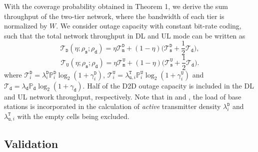 \documentclass[twocolumn,english]{IEEEtran}
\theoremstyle{plain}
\theoremstyle{definition}
\begin{document}
With the coverage probability obtained in Theorem 1, we derive the
sum throughput of the two-tier network, where the bandwidth of each
tier is normalized by $W$. We consider outage capacity with constant
bit-rate coding, such that the total network throughput in DL and
UL mode can be written as
\begin{equation}
\mathcal{T}_{\mathtt{D}}\left(\eta;\rho_{\mathtt{s}};\rho_{\mathtt{d}}\right)=\eta\mathcal{T}_{\mathtt{m}}^{\mathtt{D}}+\left(1-\eta\right)(\mathcal{T}_{\mathtt{s}}^{\mathtt{D}}+\frac{1}{2}\mathcal{T}_{\mathtt{d}}\bigr),\label{eq:thrpt_D}
\end{equation}
\begin{equation}
\mathcal{T}_{\mathtt{U}}\left(\eta;\rho_{\mathtt{s}};\rho_{\mathtt{d}}\right)=\eta\mathcal{T}_{\mathtt{m}}^{\mathtt{U}}+\left(1-\eta\right)(\mathcal{T}_{\mathtt{s}}^{\mathtt{U}}+\frac{1}{2}\mathcal{T}_{\mathtt{d}}\bigr).\label{eq:thrpt_U}
\end{equation}
where $\mathcal{T}_{i}^{\mathtt{D}}=\lambda_{i}^{\mathtt{D}}\mathbb{P}_{i}^{\mathtt{D}}\log_{2}(1+\gamma_{i}^{\mathtt{D}})$,
$\mathcal{T}_{i}^{\mathtt{U}}=\lambda_{\mathtt{u},i}^{\mathtt{T}}\mathbb{P}_{i}^{\mathtt{U}}\log_{2}(1+\gamma_{i}^{\mathtt{U}})$
and $\mathcal{T}_{\mathtt{d}}=\lambda_{\mathtt{d}}\mathbb{P}_{\mathtt{d}}\log_{2}(1+\gamma_{\mathtt{d}})$.
Half of the D2D outage capacity is included in the DL and UL network
throughput, respectively. Note that in  and
, the load of base stations is incorporated
in the calculation of \emph{active} transmitter density $\lambda_{i}^{\mathtt{D}}$
and $\lambda_{\mathtt{u},i}^{\mathtt{T}}$ with the empty cells being
excluded.


\subsection{Validation}
\end{document}
